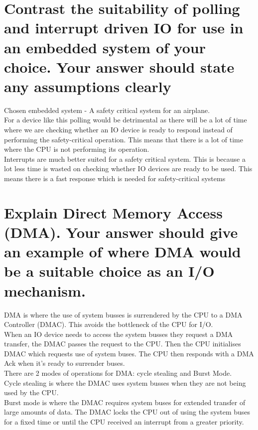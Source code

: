 \documentclass{article}
\begin{document}
\section{Contrast the suitability of polling and interrupt driven IO for use in an embedded system of your choice. Your answer should state any assumptions clearly}
Chosen embedded system - A safety critical system for an airplane.\\
For a device like this polling would be detrimental as there will be a lot of
time where we are checking whether an IO device is ready to respond instead of
performing the safety-critical operation. This means that there is a lot of time
where the CPU is not performing its operation.\\
Interrupts are much better suited for a safety critical system. This is because
a lot less time is wasted on checking whether IO devices are ready to be used.
This means there is a fast response which is needed for safety-critical systems

\section{Explain Direct Memory Access (DMA). Your answer should give an example of where DMA would be a suitable choice as an I/O mechanism.}

DMA is where the use of system busses is surrendered by the CPU to a DMA
Controller (DMAC). This avoids the bottleneck of the CPU for I/O.\\
When an IO device needs to access the system busses they request a DMA transfer,
the DMAC passes the request to the CPU. Then the CPU initialises DMAC which
requests use of system buses. The CPU then responds with a DMA Ack when it's
ready to surrender buses.\\
There are 2 modes of operations for DMA: cycle stealing and Burst Mode.\\
Cycle stealing is where the DMAC uses system busses when they are not being used
by the CPU.\\
Burst mode is where the DMAC requires system buses for extended transfer of
large amounts of data. The DMAC locks the CPU out of using the system buses for
a fixed time or until the CPU received an interrupt from a greater priority.
\newpage
\end{document}
